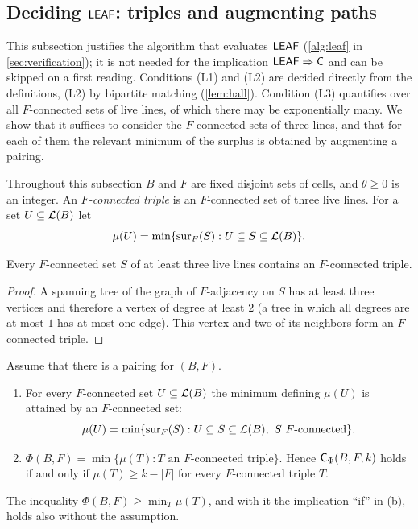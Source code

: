 \subsection{Deciding \texorpdfstring{$\mathsf{LEAF}$}{LEAF}: triples and augmenting paths}\label{ssec:deciding}

This subsection justifies the algorithm that evaluates $\mathsf{LEAF}$ (\cref{alg:leaf} in
\cref{sec:verification}); it is not needed for the implication $\mathsf{LEAF}\Rightarrow\mathsf{C}$ and can be skipped on a
first reading. Conditions (L1) and (L2) are decided directly from the definitions, (L2) by bipartite matching
(\cref{lem:hall}). Condition (L3) quantifies over all $F$-connected sets of live lines, of which there
may be exponentially many. We show that it suffices to consider the $F$-connected sets of three lines,
and that for each of them the relevant minimum of the surplus is obtained by augmenting a pairing.

Throughout this subsection $B$ and $F$ are fixed disjoint sets of cells, and $\theta\ge 0$ is an integer.
An \emph{$F$-connected triple} is an $F$-connected set of three live lines. For a set $U\subseteq\mathcal{L}(B)$
let
\[
  \mu(U)=\min\{\operatorname{sur}_F(S) : U\subseteq S\subseteq\mathcal{L}(B)\}.
\]

\begin{lemma}\label{lem:triple}
Every $F$-connected set $S$ of at least three live lines contains an $F$-connected triple.
\end{lemma}

\begin{proof}
A spanning tree of the graph of $F$-adjacency on $S$ has at least three vertices and therefore a vertex
of degree at least $2$ (a tree in which all degrees are at most $1$ has at most one edge). This vertex
and two of its neighbors form an $F$-connected triple.
\end{proof}

\begin{proposition}\label{prop:triples}
Assume that there is a pairing for $(B,F)$.
\begin{enumerate}[label=\textup{(\alph*)}]
\item For every $F$-connected set $U\subseteq\mathcal{L}(B)$ the minimum defining $\mu(U)$ is attained by an
      $F$-connected set:
      \[ \mu(U)=\min\{\operatorname{sur}_F(S) : U\subseteq S\subseteq\mathcal{L}(B),\ S\ F\text{-connected}\}. \]
\item $\Phi(B,F)=\min\{\mu(T) : T \text{ an $F$-connected triple}\}$. Hence $\mathsf{C}_\Phi(B,F,k)$ holds if and only
      if $\mu(T)\ge k-|F|$ for every $F$-connected triple $T$.
\end{enumerate}
The inequality $\Phi(B,F)\ge\min_T\mu(T)$, and with it the implication ``if'' in \textup{(b)}, holds also
without the assumption.
\end{proposition}

